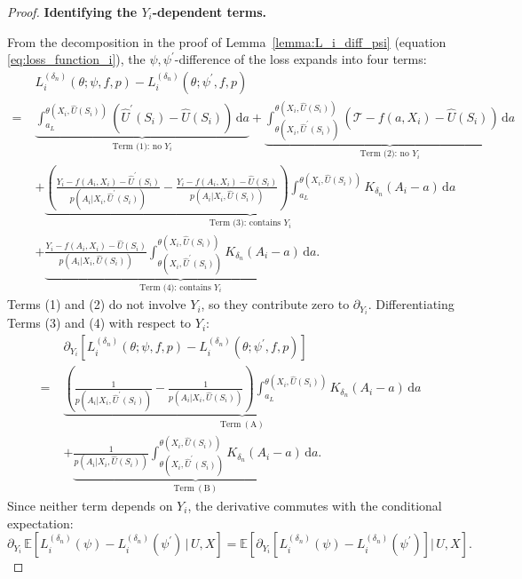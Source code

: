 \documentclass[12pt]{article}
\newcommand{\E}{\mathbb{E}}
\begin{document}
\begin{proof}
\noindent\textbf{Identifying the $Y_i$-dependent terms.}

From the decomposition in the proof of Lemma~\ref{lemma:L_i_diff_psi} (equation \eqref{eq:loss_function_i}), the $\psi,\psi^\prime$-difference of the loss expands into four terms:
\begin{align*}
&L^{(\delta_n)}_i(\theta;\psi,f,p) - L^{(\delta_n)}_i(\theta;\psi^\prime,f,p)\\
=\;&\underbrace{\int_{a_L}^{\theta(X_i,\widehat U(S_i))}(\widehat U^\prime(S_i)-\widehat U(S_i))\,\mathrm{d}a}_{\text{Term (1): no }Y_i}
+\underbrace{\int_{\theta(X_i,\widehat U^\prime(S_i))}^{\theta(X_i,\widehat U(S_i))}(\mathcal{T}-f(a,X_i)-\widehat U(S_i))\,\mathrm{d}a}_{\text{Term (2): no }Y_i}\\
&+\underbrace{\left(\frac{Y_i-f(A_i,X_i)-\widehat U^\prime(S_i)}{p(A_i|X_i,\widehat U^\prime(S_i))}-\frac{Y_i-f(A_i,X_i)-\widehat U(S_i)}{p(A_i|X_i,\widehat U(S_i))}\right)\int_{a_L}^{\theta(X_i,\widehat U(S_i))}K_{\delta_n}(A_i-a)\,\mathrm{d}a}_{\text{Term (3): contains }Y_i}\\
&+\underbrace{\frac{Y_i-f(A_i,X_i)-\widehat U(S_i)}{p(A_i|X_i,\widehat U(S_i))}\int_{\theta(X_i,\widehat U^\prime(S_i))}^{\theta(X_i,\widehat U(S_i))}K_{\delta_n}(A_i-a)\,\mathrm{d}a}_{\text{Term (4): contains }Y_i}.
\end{align*}
Terms (1) and (2) do not involve $Y_i$, so they contribute zero to $\partial_{Y_i}$.  Differentiating Terms (3) and (4) with respect to $Y_i$:
\begin{align*}
&\partial_{Y_i}\!\left[L^{(\delta_n)}_i(\theta;\psi,f,p) - L^{(\delta_n)}_i(\theta;\psi^\prime,f,p)\right]\\
=\;&\underbrace{\left(\frac{1}{p(A_i|X_i,\widehat U^\prime(S_i))}-\frac{1}{p(A_i|X_i,\widehat U(S_i))}\right)\int_{a_L}^{\theta(X_i,\widehat U(S_i))}K_{\delta_n}(A_i-a)\,\mathrm{d}a}_{\mathrm{Term\ (A)}}\\
&+\underbrace{\frac{1}{p(A_i|X_i,\widehat U(S_i))}\int_{\theta(X_i,\widehat U^\prime(S_i))}^{\theta(X_i,\widehat U(S_i))}K_{\delta_n}(A_i-a)\,\mathrm{d}a}_{\mathrm{Term\ (B)}}.
\end{align*}
Since neither term depends on $Y_i$, the derivative commutes with the conditional expectation:
$$\partial_{Y_i}\,\E\!\left[L^{(\delta_n)}_i(\psi)-L^{(\delta_n)}_i(\psi^\prime)\,\big|\,U,X\right] = \E\!\left[\partial_{Y_i}\!\left[L^{(\delta_n)}_i(\psi)-L^{(\delta_n)}_i(\psi^\prime)\right]\Big|\,U,X\right].$$


\end{proof}
\end{document}
